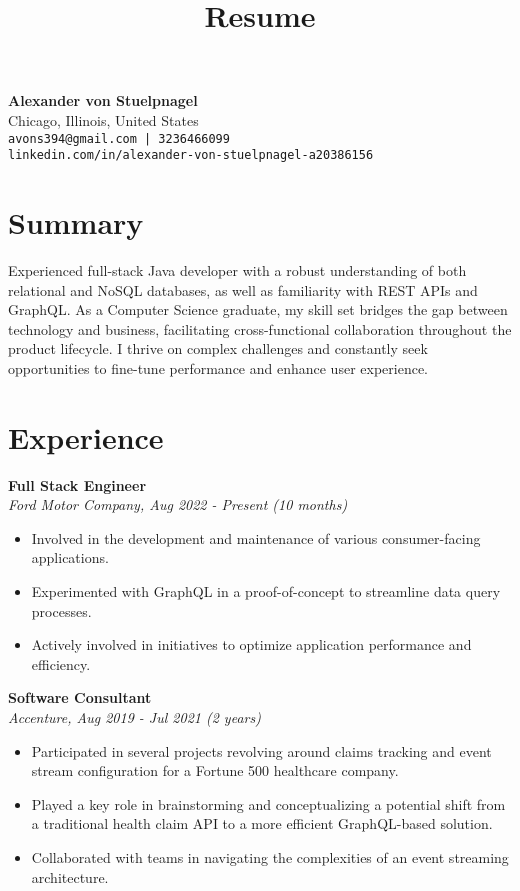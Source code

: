 \documentclass[a4paper,10pt]{article}
\title{\vspace{-4cm}Resume}
\date{}
\begin{document}
\maketitle

\noindent
\textbf{Alexander von Stuelpnagel}\\
Chicago, Illinois, United States\\
\texttt{avons394@gmail.com | 3236466099}\\
\texttt{linkedin.com/in/alexander-von-stuelpnagel-a20386156}

\section*{Summary}

Experienced full-stack Java developer with a robust understanding of both relational and NoSQL databases, as well as familiarity with REST APIs and GraphQL. As a Computer Science graduate, my skill set bridges the gap between technology and business, facilitating cross-functional collaboration throughout the product lifecycle. I thrive on complex challenges and constantly seek opportunities to fine-tune performance and enhance user experience.

\section*{Experience}

\noindent
\textbf{Full Stack Engineer}\\
\textit{Ford Motor Company, Aug 2022 - Present (10 months)}
\begin{itemize}[noitemsep]
    \item Involved in the development and maintenance of various consumer-facing applications.
    \item Experimented with GraphQL in a proof-of-concept to streamline data query processes.
    \item Actively involved in initiatives to optimize application performance and efficiency.
\end{itemize}

\noindent
\textbf{Software Consultant}\\
\textit{Accenture, Aug 2019 - Jul 2021 (2 years)}
\begin{itemize}[noitemsep]
    \item Participated in several projects revolving around claims tracking and event stream configuration for a Fortune 500 healthcare company.
    \item Played a key role in brainstorming and conceptualizing a potential shift from a traditional health claim API to a more efficient GraphQL-based solution.
    \item Collaborated with teams in navigating the complexities of an event streaming architecture.
\end{itemize}
\end{document}
